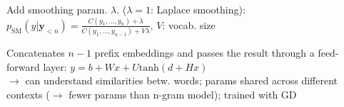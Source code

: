  Add smoothing param. \(\lambda\). (\(\lambda=1\): Laplace smoothing):
\(p_{\text{SM}}(y|\boldsymbol{y}_{<n}) = \frac{C(y_1, \dots, y_n) + \lambda}{C(y_1, \dots, y_{n-1}) + V\lambda}\), \(V\): vocab. size

 Concatenates \(n-1\) prefix embeddings and passes the result through a feed-forward layer:
\(y = b + Wx + U \text{tanh}(d + Hx)\)\\
$\to$ can understand similarities betw. words; params shared across different contexts ($\to$ fewer params than n-gram model); trained with GD





